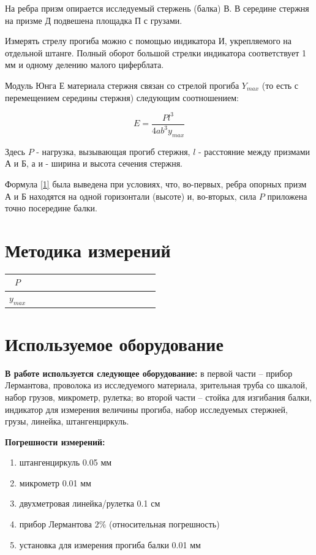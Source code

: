 \documentclass[a4paper,12pt]{article} %
\begin{document}
    На ребра призм опирается исследуемый стержень (балка) В. В середине стержня на призме Д подвешена площадка П с грузами. 
    
    Измерять стрелу прогиба можно с помощью индикатора И, укрепляемого на отдельной штанге. Полный оборот большой стрелки индикатора соответствует 1 мм и одному делению малого циферблата.
    
    Модуль Юнга Е материала стержня связан со стрелой прогиба $Y_{max}$ (то есть с перемещением середины стержня) следующим соотношением:
    
    \begin{equation} \label{1}
        E = \frac {Pl^3}{4ab^3y_{max}}
    \end{equation}
    
    Здесь $ P $  - нагрузка, вызывающая прогиб стержня, $ l $  - расстояние между призмами А и Б, а и - ширина и высота сечения стержня.

    Формула \eqref{1} была выведена при условиях, что, во-первых, ребра опорных призм А и Б находятся на одной горизонтали (высоте) и, во-вторых, сила $ P $  приложена точно посередине балки.

	\section{Методика измерений}
    \begin{table}[!ht]
        \centering
        \begin{tabular}{|c|c|c|c|c|c|c|c|c|c|c}
            \hline
        $ P $   & ~ & ~ & ~ & ~ & ~ & ~ & ~ &  ~\\ \hline
        $y_{max}$ & ~ & ~ & ~ & ~ & ~ & ~ & ~ &  ~\\ \hline
        \end{tabular}
    \end{table}

    \section{Используемое оборудование}
    \textbf{В работе используется следующее оборудование:} в первой части -- прибор Лермантова, проволока из исследуемого материала, зрительная труба со шкалой,
    набор грузов, микрометр, рулетка; во второй части -- стойка для
    изгибания балки, индикатор для измерения величины прогиба, набор
    исследуемых стержней, грузы, линейка, штангенциркуль.

    \textbf{Погрешности измерений:}  \begin{enumerate}
        \item штангенциркуль 0.05 мм
        \item микрометр 0.01 мм
        \item двухметровая линейка/рулетка 0.1 см
        \item прибор Лермантова $ 2\% $ (относительная погрешность)
        \item установка для измерения прогиба балки 0.01 мм 
    \end{enumerate}
\end{document}
